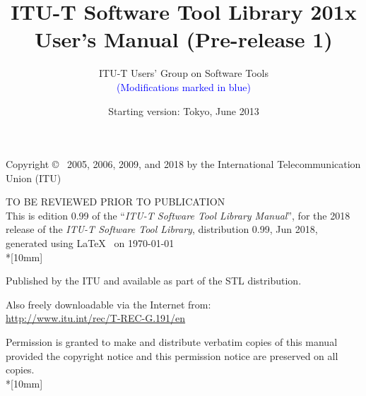 \documentclass[12pt,a4paper]{book}
\begin{document}
\SF

\def\sixsf{\footnotesize\tt}
\def\tenrm{\small\tt}
\def\twlsf{\sf}


\title{ITU-T Software Tool Library 201x User's Manual (Pre-release 1)}
\author{ITU-T Users' Group on Software Tools\\
\textcolor{blue}{(Modifications marked in blue)}}
\date{Starting version: Tokyo, June 2013}

\maketitle
\thispagestyle{empty}


 Copyright \copyright~ 2005, 2006, 2009, and 2018 by the International
 Telecommunication Union (ITU)


TO BE REVIEWED PRIOR TO PUBLICATION \\
This is edition 0.99 of the ``{\em ITU-T Software Tool Library
  Manual}'', for the 2018 release of the {\em ITU-T Software Tool
  Library}, distribution 0.99, Jun 2018, generated using \LaTeX
~on \today\\*[10mm]

Published by the ITU and available as part of the STL distribution.

Also freely downloadable via the Internet from: \\
\url{http://www.itu.int/rec/T-REC-G.191/en}

Permission is granted to make and distribute verbatim copies of this manual
provided the copyright notice and this permission notice are preserved on
all copies.\\*[10mm]

\tableofcontents

\def\long{{\tt long}}
\end{document}
